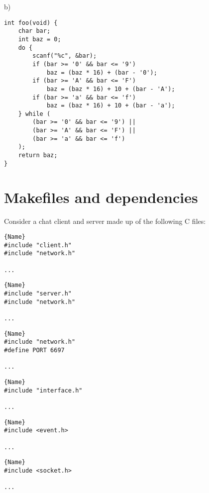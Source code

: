 \documentclass[a4paper,12pt]{article}
\begin{document}
b)

\begin{lstlisting}
int foo(void) {
	char bar;
	int baz = 0;
	do {
		scanf("%c", &bar);
		if (bar >= '0' && bar <= '9')
			baz = (baz * 16) + (bar - '0');
		if (bar >= 'A' && bar <= 'F')
			baz = (baz * 16) + 10 + (bar - 'A');
		if (bar >= 'a' && bar <= 'f')
			baz = (baz * 16) + 10 + (bar - 'a');
	} while (
		(bar >= '0' && bar <= '9') ||
		(bar >= 'A' && bar <= 'F') ||
		(bar >= 'a' && bar <= 'f')
	);
	return baz;
}
\end{lstlisting}

\newpage

\section{Makefiles and dependencies}

Consider a chat client and server made up of the following C files:

\begin{minipage}{.3\textwidth}
\begin{lstlisting}[caption=client.c,frame=tlrb]{Name}
#include "client.h"
#include "network.h"

...
\end{lstlisting}
\end{minipage}\hfill
\begin{minipage}{.3\textwidth}
\begin{lstlisting}[caption=server.c,frame=tlrb]{Name}
#include "server.h"
#include "network.h"

...
\end{lstlisting}
\end{minipage}\hfill
\begin{minipage}{.3\textwidth}
\begin{lstlisting}[caption=network.c,frame=tlrb]{Name}
#include "network.h"
#define PORT 6697

...
\end{lstlisting}
\end{minipage}

\begin{minipage}{.3\textwidth}
\begin{lstlisting}[caption=client.h,frame=tlrb]{Name}
#include "interface.h"

...
\end{lstlisting}
\end{minipage}\hfill
\begin{minipage}{.3\textwidth}
\begin{lstlisting}[caption=server.h,frame=tlrb]{Name}
#include <event.h>

...
\end{lstlisting}
\end{minipage}\hfill
\begin{minipage}{.3\textwidth}
\begin{lstlisting}[caption=network.h,frame=tlrb]{Name}
#include <socket.h>

...
\end{lstlisting}
\end{minipage}
\end{document}
